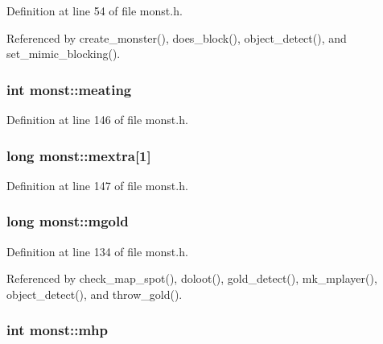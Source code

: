Definition at line 54 of file monst.\+h.



Referenced by create\+\_\+monster(), does\+\_\+block(), object\+\_\+detect(), and set\+\_\+mimic\+\_\+blocking().

\hypertarget{structmonst_ac6633f5d2ad6b74ec498541f3a3fe38b}{
\subsubsection[{meating}]{\setlength{\rightskip}{0pt plus 5cm}int monst\+::meating}}\label{structmonst_ac6633f5d2ad6b74ec498541f3a3fe38b}


Definition at line 146 of file monst.\+h.

\hypertarget{structmonst_a3fea4dd3adc3f4921e8b68a1f31326dd}{
\subsubsection[{mextra}]{\setlength{\rightskip}{0pt plus 5cm}long monst\+::mextra\mbox{[}1\mbox{]}}}\label{structmonst_a3fea4dd3adc3f4921e8b68a1f31326dd}


Definition at line 147 of file monst.\+h.

\hypertarget{structmonst_a06dbdd0ca7ee096216aa10f86beed533}{
\subsubsection[{mgold}]{\setlength{\rightskip}{0pt plus 5cm}long monst\+::mgold}}\label{structmonst_a06dbdd0ca7ee096216aa10f86beed533}


Definition at line 134 of file monst.\+h.



Referenced by check\+\_\+map\+\_\+spot(), doloot(), gold\+\_\+detect(), mk\+\_\+mplayer(), object\+\_\+detect(), and throw\+\_\+gold().

\hypertarget{structmonst_abe22e95755f1348a6a1c78252be5d76d}{
\subsubsection[{mhp}]{\setlength{\rightskip}{0pt plus 5cm}int monst\+::mhp}}\label{structmonst_abe22e95755f1348a6a1c78252be5d76d}


